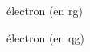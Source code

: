 




\begin{enonce}
électron (en rg)
\end{enonce}





\begin{enonce}
électron (en qg)
\end{enonce}





\finEntrainement







